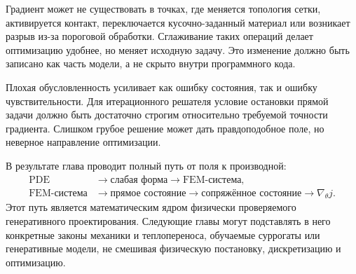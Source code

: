 Градиент может не существовать в точках, где меняется топология сетки, активируется контакт, переключается кусочно-заданный материал или возникает разрыв из-за пороговой обработки. Сглаживание таких операций делает оптимизацию удобнее, но меняет исходную задачу. Это изменение должно быть записано как часть модели, а не скрыто внутри программного кода.

Плохая обусловленность усиливает как ошибку состояния, так и ошибку чувствительности. Для итерационного решателя условие остановки прямой задачи должно быть достаточно строгим относительно требуемой точности градиента. Слишком грубое решение может дать правдоподобное поле, но неверное направление оптимизации.

В результате глава проводит полный путь от поля к производной:
\[
\begin{aligned}
 \text{PDE}
 &\longrightarrow
 \text{слабая форма}
 \longrightarrow
 \text{FEM-система},\\
 \text{FEM-система}
 &\longrightarrow
 \text{прямое состояние}
 \longrightarrow
 \text{сопряжённое состояние}
 \longrightarrow
 \nabla_\theta j.
\end{aligned}
\]
Этот путь является математическим ядром физически проверяемого генеративного проектирования. Следующие главы могут подставлять в него конкретные законы механики и теплопереноса, обучаемые суррогаты или генеративные модели, не смешивая физическую постановку, дискретизацию и оптимизацию.
